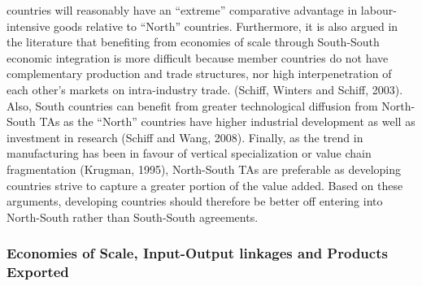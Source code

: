 countries will reasonably have an ``extreme'' comparative advantage in
labour-intensive goods relative to ``North'' countries. Furthermore, it
is also argued in the literature that benefiting from economies of scale
through South-South economic integration is more difficult because
member countries do not have complementary production and trade
structures, nor high interpenetration of each other's markets on
intra-industry trade. (Schiff, Winters and Schiff, 2003). Also, South
countries can benefit from greater technological diffusion from
North-South TAs as the ``North'' countries have higher industrial
development as well as investment in research (Schiff and Wang, 2008).
Finally, as the trend in manufacturing has been in favour of vertical
specialization or value chain fragmentation (Krugman, 1995), North-South
TAs are preferable as developing countries strive to capture a greater
portion of the value added. Based on these arguments, developing
countries should therefore be better off entering into North-South
rather than South-South agreements.%
\subsubsection{Economies of Scale, Input{-}Output linkages and Products Exported}%
\label{ssubsec:EconomiesofScale,Input{-}OutputlinkagesandProductsExported}%

